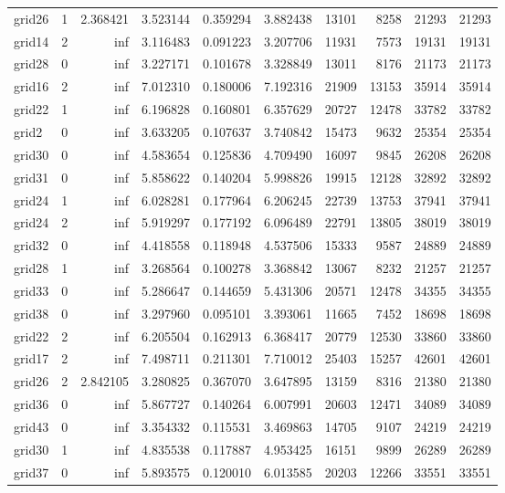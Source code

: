 \begin{longtable}{|l|r|r|r|r|r|r|r|r|r|}
grid26 & 1 & 2.368421 & 3.523144 & 0.359294 & 3.882438 & 13101 & 8258 & 21293 & 21293 \\
grid14 & 2 & inf & 3.116483 & 0.091223 & 3.207706 & 11931 & 7573 & 19131 & 19131 \\
grid28 & 0 & inf & 3.227171 & 0.101678 & 3.328849 & 13011 & 8176 & 21173 & 21173 \\
grid16 & 2 & inf & 7.012310 & 0.180006 & 7.192316 & 21909 & 13153 & 35914 & 35914 \\
grid22 & 1 & inf & 6.196828 & 0.160801 & 6.357629 & 20727 & 12478 & 33782 & 33782 \\
grid2 & 0 & inf & 3.633205 & 0.107637 & 3.740842 & 15473 & 9632 & 25354 & 25354 \\
grid30 & 0 & inf & 4.583654 & 0.125836 & 4.709490 & 16097 & 9845 & 26208 & 26208 \\
grid31 & 0 & inf & 5.858622 & 0.140204 & 5.998826 & 19915 & 12128 & 32892 & 32892 \\
grid24 & 1 & inf & 6.028281 & 0.177964 & 6.206245 & 22739 & 13753 & 37941 & 37941 \\
grid24 & 2 & inf & 5.919297 & 0.177192 & 6.096489 & 22791 & 13805 & 38019 & 38019 \\
grid32 & 0 & inf & 4.418558 & 0.118948 & 4.537506 & 15333 & 9587 & 24889 & 24889 \\
grid28 & 1 & inf & 3.268564 & 0.100278 & 3.368842 & 13067 & 8232 & 21257 & 21257 \\
grid33 & 0 & inf & 5.286647 & 0.144659 & 5.431306 & 20571 & 12478 & 34355 & 34355 \\
grid38 & 0 & inf & 3.297960 & 0.095101 & 3.393061 & 11665 & 7452 & 18698 & 18698 \\
grid22 & 2 & inf & 6.205504 & 0.162913 & 6.368417 & 20779 & 12530 & 33860 & 33860 \\
grid17 & 2 & inf & 7.498711 & 0.211301 & 7.710012 & 25403 & 15257 & 42601 & 42601 \\
grid26 & 2 & 2.842105 & 3.280825 & 0.367070 & 3.647895 & 13159 & 8316 & 21380 & 21380 \\
grid36 & 0 & inf & 5.867727 & 0.140264 & 6.007991 & 20603 & 12471 & 34089 & 34089 \\
grid43 & 0 & inf & 3.354332 & 0.115531 & 3.469863 & 14705 & 9107 & 24219 & 24219 \\
grid30 & 1 & inf & 4.835538 & 0.117887 & 4.953425 & 16151 & 9899 & 26289 & 26289 \\
grid37 & 0 & inf & 5.893575 & 0.120010 & 6.013585 & 20203 & 12266 & 33551 & 33551 \\

\end{longtable}

